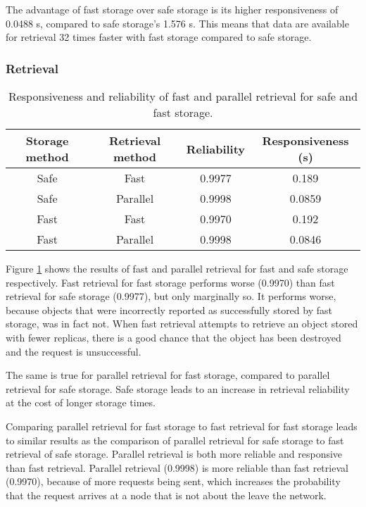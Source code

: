 The advantage of fast storage over safe storage is its higher responsiveness of 0.0488 s, compared to safe storage's 1.576 s. This means that data are available for retrieval 32 times faster with fast storage compared to safe storage.

\subsubsection{Retrieval}

\begin{table}[htbp]
\centering
\begin{tabular}{|c|c|c|c|}
\hline
Storage method & Retrieval method & Reliability & Responsiveness (s)\\
\hline
Safe    &   Fast        &   0.9977  &   0.189  \\
Safe    &   Parallel    &   0.9998  &   0.0859 \\
Fast    &   Fast        &   0.9970  &   0.192  \\
Fast    &   Parallel    &   0.9998  &   0.0846 \\
\hline
\end{tabular}
\caption{Responsiveness and reliability of fast and parallel retrieval for safe and fast storage.}
\label{tab_pithos_retrieval_results}
\end{table}
%
Figure \ref{tab_pithos_retrieval_results} shows the results of fast and parallel retrieval for fast and safe storage respectively. Fast retrieval for fast storage performs worse (0.9970) than fast retrieval for safe storage (0.9977), but only marginally so. It performs worse, because objects that were incorrectly reported as successfully stored by fast storage, was in fact not. When fast retrieval attempts to retrieve an object stored with fewer replicas, there is a good chance that the object has been destroyed and the request is unsuccessful.

The same is true for parallel retrieval for fast storage, compared to parallel retrieval for safe storage. Safe storage leads to an increase in retrieval reliability at the cost of longer storage times.

Comparing parallel retrieval for fast storage to fast retrieval for fast storage leads to similar results as the comparison of parallel retrieval for safe storage to fast retrieval of safe storage. Parallel retrieval is both more reliable and responsive than fast retrieval. Parallel retrieval (0.9998) is more reliable than fast retrieval (0.9970), because of more requests being sent, which increases the probability that the request arrives at a node that is not about the leave the network.

